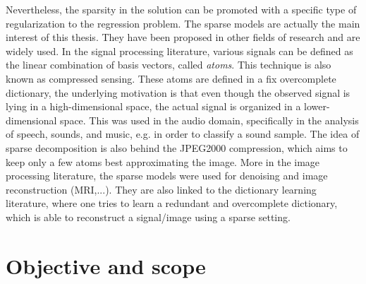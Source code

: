 Nevertheless, the sparsity in the solution can be promoted with a specific type of regularization to the regression problem. The sparse models are actually the main interest of this thesis. They have been proposed in other fields of research and are widely used. In the signal processing literature, various signals can be defined as the linear combination of basis vectors, called \textit{atoms}. This technique is also known as compressed sensing. These atoms are defined in a fix overcomplete dictionary, the underlying motivation is that even though the observed signal is lying in a high-dimensional space, the actual signal is organized in a lower-dimensional space. This was used in the audio domain, specifically in the analysis of speech, sounds, and music, e.g. in order to classify a sound sample. The idea of sparse decomposition is also behind the JPEG2000 compression, which aims to keep only a few atoms best approximating the image. More in the image processing literature, the sparse models were used for denoising and image reconstruction (MRI,...). They are also linked to the dictionary learning literature, where one tries to learn a redundant and overcomplete dictionary, which is able to reconstruct a signal/image using a sparse setting.\\

\section*{Objective and scope}

